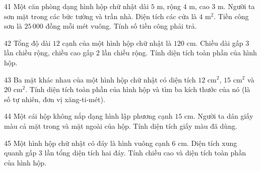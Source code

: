 \gap
\begin{probbox}{41}{}
Một căn phòng dạng hình hộp chữ nhật dài $5$ m, rộng $4$ m, cao $3$ m. Người ta sơn mặt trong các bức tường và trần nhà. Diện tích các cửa là $4$ m$^2$. Tiền công sơn là $25\,000$ đồng mỗi mét vuông. Tính số tiền công phải trả.
\end{probbox}
\gap
\begin{probbox}{42}{}
Tổng độ dài $12$ cạnh của một hình hộp chữ nhật là $120$ cm. Chiều dài gấp $3$ lần chiều rộng, chiều cao gấp $2$ lần chiều rộng. Tính diện tích toàn phần của hình hộp.
\end{probbox}
\gap
\begin{probbox}{43}{}
Ba mặt khác nhau của một hình hộp chữ nhật có diện tích $12$ cm$^2$, $15$ cm$^2$ và $20$ cm$^2$. Tính diện tích toàn phần của hình hộp và tìm ba kích thước của nó (là số tự nhiên, đơn vị xăng-ti-mét).
\end{probbox}
\gap
\begin{probbox}{44}{}
Một cái hộp không nắp dạng hình lập phương cạnh $15$ cm. Người ta dán giấy màu cả mặt trong và mặt ngoài của hộp. Tính diện tích giấy màu đã dùng.
\end{probbox}
\gap
\begin{probbox}{45}{}
Một hình hộp chữ nhật có đáy là hình vuông cạnh $6$ cm. Diện tích xung quanh gấp $3$ lần tổng diện tích hai đáy. Tính chiều cao và diện tích toàn phần của hình hộp.
\end{probbox}
